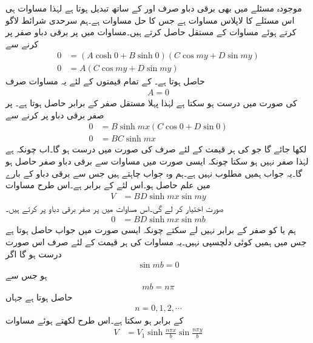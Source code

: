 موجودہ مسئلے میں بھی برقی دباو صرف  اور  کے ساتھ تبدیل ہوتا ہے لہٰذا مساوات  ہی اس مسئلے کا لاپلاس مساوات ہے جس کا حل مساوات  ہے۔ہم سرحدی شرائط لاگو کرتے ہوئے مساوات کے مستقل حاصل کرتے ہیں۔مساوات  میں  پر برقی دباو صفر پر کرنے سے
\begin{align*}
0&=\left( A \cosh 0+B \sinh 0\right) \left(C \cos m y+D \sin m y \right)\\
0&=A \left(C \cos m y+D \sin m y \right)
\end{align*}
حاصل ہوتا ہے۔  کے تمام قیمتوں کے لئے یہ مساوات صرف 
\begin{align*}
A=0
\end{align*}
کی صورت میں درست ہو سکتا ہے لہٰذا پہلا مستقل صفر کے برابر حاصل ہوتا ہے۔ پر صفر برقی دباو پر کرنے سے
\begin{align*}
0&=B \sinh mx  \left(C \cos 0+D \sin 0 \right)\\
0&=BC \sinh mx 
\end{align*}
لکھا جائے گا جو  کی ہر قیمت کے لئے صرف  کی صورت میں درست ہو گا۔اب چونکہ  ہے لہٰذا  صفر نہیں ہو سکتا چونکہ ایسی صورت میں مساوات  سے برقی دباو صفر حاصل ہو گا۔یہ جواب ہمیں مطلوب نہیں ہے۔ہم وہ جواب چاہتے ہیں جس سے برقی دباو کے بارے میں علم حاصل ہو۔اس لئے  کے برابر ہے۔اس طرح مساوات 
\begin{align}\label{مساوات_لاپلاس_ڈبہ_مثال}
V&=BD \sinh mx  \sin m y 
\end{align}
صورت اختیار کر لے گی۔اس مساوات میں  پر صفر برقی دباو پر کرتے ہیں۔
 \begin{align*}
0&=BD \sinh mx  \sin m b 
\end{align*}
ہم  یا  کو صفر کے برابر نہیں لے سکتے چونکہ ایسی صورت میں  جواب حاصل ہوتا ہے جس میں ہمیں کوئی دلچسپی نہیں۔یہ مساوات  کی ہر قیمت کے لئے صرف اس صورت درست ہو گا اگر 
\begin{align*}
\sin mb=0
\end{align*}
ہو جس سے
\begin{align*}
mb = n\pi 
\end{align*}
حاصل ہوتا ہے جہاں
\begin{align*}
n=0,1,2,\cdots
\end{align*}
کے برابر ہو سکتا ہے۔اس طرح  لکھتے ہوئے مساوات 
\begin{align}\label{مساوات_لاپلاس_ڈبہ_مثال_تین_شرائط_پورے}
V&=V_1 \sinh \frac{n\pi x}{b}  \sin \frac{n\pi y}{b} 
\end{align}
